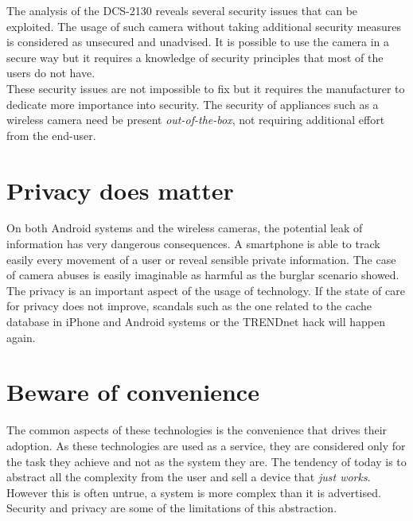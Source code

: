 The analysis of the DCS-2130 reveals several security issues that can be exploited.
The usage of such camera without taking additional security measures is  considered as unsecured and unadvised.
It is possible to use the camera in a secure way but it requires a knowledge of security principles that most of the users do not have.\\

These security issues are not impossible to fix but it requires the manufacturer to dedicate more importance into security.
The security of appliances such as a wireless camera need be present \emph{out-of-the-box}, not requiring additional effort from the end-user.

\section{Privacy does matter}

On both Android systems and the wireless cameras, the potential leak of information has very dangerous consequences.
A smartphone is able to track easily every movement of a user or reveal sensible private information.
The case of camera abuses is easily imaginable as harmful as the burglar scenario showed.\\

The privacy is an important aspect of the usage of technology.
If the state of care for privacy does not improve, scandals such as the one related to the cache database in iPhone and Android systems or the TRENDnet hack will happen again.

\section{Beware of convenience}

The common aspects of these technologies is the convenience that drives their adoption.
As these technologies are used as a service, they are considered only for the task they achieve and not as the system they are.
The tendency of today is to abstract all the complexity from the user and sell a device that \emph{just works}.
However this is often untrue, a system is more complex than it is advertised.
Security and privacy are some of the limitations of this abstraction.


